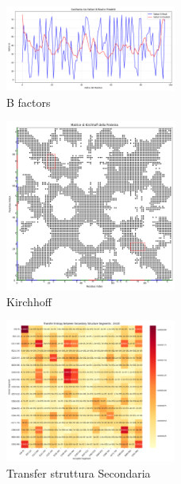 \documentclass[Lau,binding=0.6cm,oneside,noexaminfo]{sapthesis}
\begin{document}
\begin{figure}[H]
    \centering
    \includegraphics[width=0.5\textwidth]{"images/2m10Confronto tra Fattori B Reali e Predetti.png"}
    \caption{B factors}
\end{figure}
\begin{figure}[H]
    \centering
    \includegraphics[width=0.5\textwidth]{"images/2m10_Matrice di Kirchhoff della Proteina.png"}
    \caption{Kirchhoff}
\end{figure}
\begin{figure}[H]
    \centering
    \includegraphics[width=0.5\textwidth]{"images/2m10analyze_secondary_structure_transfer_entropy.png"}
    \caption{Transfer struttura Secondaria}
\end{figure}
\end{document}
